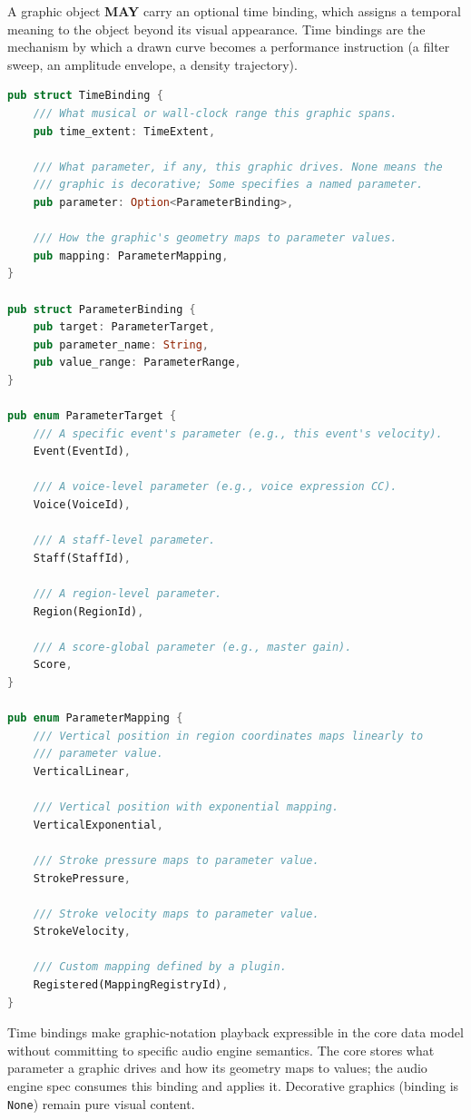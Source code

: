 \documentclass[11pt,letterpaper]{report}
\newcommand{\MAY}{\textbf{MAY}}
\begin{document}
A graphic object \MAY{} carry an optional time binding, which assigns
a temporal meaning to the object beyond its visual appearance. Time
bindings are the mechanism by which a drawn curve becomes a performance
instruction (a filter sweep, an amplitude envelope, a density
trajectory).

\begin{lstlisting}[language=Rust]
pub struct TimeBinding {
    /// What musical or wall-clock range this graphic spans.
    pub time_extent: TimeExtent,

    /// What parameter, if any, this graphic drives. None means the
    /// graphic is decorative; Some specifies a named parameter.
    pub parameter: Option<ParameterBinding>,

    /// How the graphic's geometry maps to parameter values.
    pub mapping: ParameterMapping,
}

pub struct ParameterBinding {
    pub target: ParameterTarget,
    pub parameter_name: String,
    pub value_range: ParameterRange,
}

pub enum ParameterTarget {
    /// A specific event's parameter (e.g., this event's velocity).
    Event(EventId),

    /// A voice-level parameter (e.g., voice expression CC).
    Voice(VoiceId),

    /// A staff-level parameter.
    Staff(StaffId),

    /// A region-level parameter.
    Region(RegionId),

    /// A score-global parameter (e.g., master gain).
    Score,
}

pub enum ParameterMapping {
    /// Vertical position in region coordinates maps linearly to
    /// parameter value.
    VerticalLinear,

    /// Vertical position with exponential mapping.
    VerticalExponential,

    /// Stroke pressure maps to parameter value.
    StrokePressure,

    /// Stroke velocity maps to parameter value.
    StrokeVelocity,

    /// Custom mapping defined by a plugin.
    Registered(MappingRegistryId),
}
\end{lstlisting}

\begin{rationale}
  Time bindings make graphic-notation playback expressible in the core
  data model without committing to specific audio engine semantics.
  The core stores what parameter a graphic drives and how its
  geometry maps to values; the audio engine spec consumes this
  binding and applies it. Decorative graphics (binding is \texttt{None})
  remain pure visual content.
\end{rationale}
\end{document}
